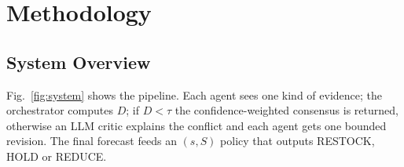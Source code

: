 \documentclass[conference]{IEEEtran}
\begin{document}
\section{Methodology}\label{sec:method}

\subsection{System Overview}
Fig.~\ref{fig:system} shows the pipeline. Each agent sees one kind of evidence; the orchestrator
computes $D$; if $D<\tau$ the confidence-weighted consensus is returned, otherwise an LLM critic
explains the conflict and each agent gets one bounded revision. The final forecast feeds an $(s,S)$
policy that outputs RESTOCK, HOLD or REDUCE.
\end{document}
